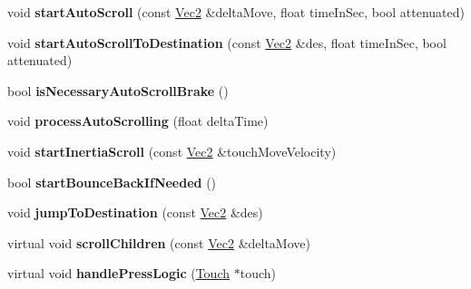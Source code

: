 \begin{DoxyCompactItemize}
\mbox{\label{classui_1_1ScrollView_a2df3af12a218cecff05b481c53f5c5a2}} 
void {\bfseries start\+Auto\+Scroll} (const \hyperlink{classVec2}{Vec2} \&delta\+Move, float time\+In\+Sec, bool attenuated)
\item 
\mbox{\label{classui_1_1ScrollView_a8e79cd518458363e820b8fb2a2545d4b}} 
void {\bfseries start\+Auto\+Scroll\+To\+Destination} (const \hyperlink{classVec2}{Vec2} \&des, float time\+In\+Sec, bool attenuated)
\item 
\mbox{\label{classui_1_1ScrollView_a10eaf542f81e6454755633233ec519fa}} 
bool {\bfseries is\+Necessary\+Auto\+Scroll\+Brake} ()
\item 
\mbox{\label{classui_1_1ScrollView_a383d4b7d5f94745d91ca345ee72bf6d3}} 
void {\bfseries process\+Auto\+Scrolling} (float delta\+Time)
\item 
\mbox{\label{classui_1_1ScrollView_ae51d4e520ab75dd203f93bdbd398cb9a}} 
void {\bfseries start\+Inertia\+Scroll} (const \hyperlink{classVec2}{Vec2} \&touch\+Move\+Velocity)
\item 
\mbox{\label{classui_1_1ScrollView_a9657d46dcbfc15eb25f90ec5d48be136}} 
bool {\bfseries start\+Bounce\+Back\+If\+Needed} ()
\item 
\mbox{\label{classui_1_1ScrollView_ad1f2e6b2192aa4318d1632ce6d59d1f4}} 
void {\bfseries jump\+To\+Destination} (const \hyperlink{classVec2}{Vec2} \&des)
\item 
\mbox{\label{classui_1_1ScrollView_a35d5fff67c5f960796accee2d2187efc}} 
virtual void {\bfseries scroll\+Children} (const \hyperlink{classVec2}{Vec2} \&delta\+Move)
\item 
\mbox{\label{classui_1_1ScrollView_acd25578d372808799ce7f8e1774f33ab}} 
virtual void {\bfseries handle\+Press\+Logic} (\hyperlink{classTouch}{Touch} $\ast$touch)
\item 
\mbox{\label{classui_1_1ScrollView_a2a44cc99fec4276623ebe3d76ddd5dfc}} 

\end{DoxyCompactItemize}
